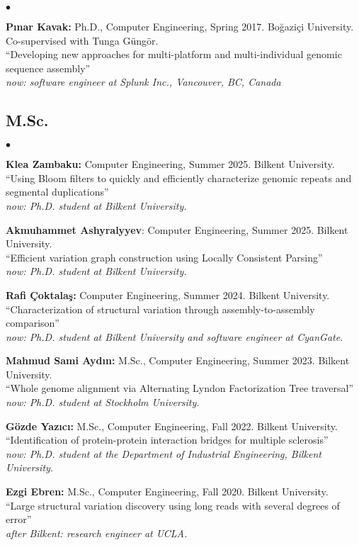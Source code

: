 \documentclass[margin,line]{res}
\newenvironment{list2}{
  \begin{list}{$\bullet$}{%
      \setlength{\itemsep}{0.1cm}
      \setlength{\parsep}{0in} \setlength{\parskip}{0in}
      \setlength{\topsep}{0in} \setlength{\partopsep}{0in} 
      \setlength{\leftmargin}{0.2in}}}{\end{list}}
\begin{document}
\begin{resume}
\begin{list2}
\item
  {\bf P{\i}nar Kavak:} Ph.D., Computer Engineering, Spring 2017.
  Bo\u{g}azi\c{c}i University. Co-supervised with Tunga G\"{u}ng\"{o}r.\\
  ``Developing new approaches for multi-platform and multi-individual genomic sequence assembly''\\
  {\it now: software engineer at Splunk Inc., Vancouver, BC, Canada}
\end{list2}

\vspace*{-.4cm}
\subsection{\small \sc M.Sc.}
\begin{list2}
  \item
    {\bf Klea Zambaku:} Computer Engineering, Summer 2025.
    Bilkent University. \\
    ``Using Bloom filters to quickly and efficiently characterize genomic repeats and segmental duplications''\\
    {\it now: Ph.D. student at Bilkent University.}  
  \item 
    \textbf{Akmuhammet Ashyralyyev}: Computer Engineering, Summer 2025. 
    Bilkent University. \\
    ``Efficient variation graph construction using Locally Consistent Parsing''\\
   {\it now: Ph.D. student at Bilkent University.}  
  \item
  {\bf Rafi Çoktalaş:} Computer Engineering, Summer 2024.
  Bilkent University.\\
  ``Characterization of structural variation through assembly-to-assembly comparison''\\
  {\it now: Ph.D. student at Bilkent University and software engineer at CyanGate.}
\item
  {\bf Mahmud Sami Aydın:} M.Sc., Computer Engineering, Summer 2023.
  Bilkent University. \\
  ``Whole genome alignment via Alternating Lyndon Factorization Tree traversal''\\
   {\it now: Ph.D. student at Stockholm University.}
  \item
  {\bf Gözde Yazıcı:} M.Sc., Computer Engineering, Fall 2022.
  Bilkent University. \\
  ``Identification of protein-protein interaction bridges for multiple sclerosis''\\
   {\it now: Ph.D. student at the Department of Industrial Engineering, Bilkent University.}
\item
  {\bf Ezgi Ebren:} M.Sc., Computer Engineering, Fall 2020. Bilkent University. \\
  ``Large structural variation discovery using long reads with several degrees of error''\\
  {\it after Bilkent: research engineer at UCLA.}



\end{list2}
\end{resume}
\end{document}
